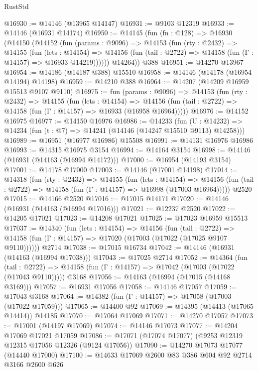 \begin{lexlean}{RustStd}
\begin{coremodule}
@16930 := @14146 (@13965 @14147)
@16931 := @9103 @12319
@16933 := @14146 (@16931 @14174)
@16950 := @14145
    (fun (fn : @128) =>
    @16930
      (@14150
        (@14152
          (fun (params : @9096) =>
          @14153
            (fun (rty : @2432) =>
            @14155
              (fun (lets : @14154) =>
              @14156 (fun (tail : @2722) => @14158 (fun (Γ : @14157) => @16933 @14219))))))
        @14264))
    @388
@16951 := @14270 @13967
@16954 := @14186 (@14187 @388) @15510
@16958 := @14146 (@14178 (@16954 @14194) @14198)
@16959 := @14210 @388
@16964 := @14207 (@14209 @16959 @15513 @9107 @9110)
@16975 := fun (params : @9096) =>
  @14153
    (fun (rty : @2432) =>
    @14155
      (fun (lets : @14154) =>
      @14156 (fun (tail : @2722) => @14158 (fun (Γ : @14157) => @16933 (@16958 @16964)))))
@16976 := @14152 @16975
@16977 := @14150 @16976
@16986 := @14233
    (fun (U : @14232) => @14234 (fun (t : @7) => @14241 (@14146 (@14247 @15510 @9113) @14258)))
@16989 := @16951 (@16977 @16986) @15508
@16991 := @14131 @16976 @16986
@16993 := @14315 @16975 @3154
@16994 := @14164 @3154
@16998 := @14146 (@16931 (@14163 (@16994 @14172)))
@17000 := @16954 (@14193 @3154)
@17001 := @14178 @17000
@17003 := @14146 (@17001 @14198)
@17014 := @14318
    (fun (rty : @2432) =>
    @14155
      (fun (lets : @14154) =>
      @14156 (fun (tail : @2722) => @14158 (fun (Γ : @14157) => @16998 (@17003 @16964)))))
    @2520
@17015 := @14166 @2520
@17016 := @17015 @14171
@17020 := @14146 (@16931 (@14163 (@16994 @17016)))
@17021 := @12237 @2520
@17022 := @14205 @17021
@17023 := @14208 @17021
@17025 := @17023 @16959 @15513
@17037 := @14340
    (fun (lets : @14154) =>
    @14156
      (fun (tail : @2722) =>
      @14158 (fun (Γ : @14157) => @17020 (@17003 (@17022 (@17025 @9107 @9110))))))
    @2714
@17038 := @17015 @16734
@17042 := @14146 (@16931 (@14163 (@16994 @17038)))
@17043 := @17025 @2714
@17052 := @14364
    (fun (tail : @2722) => @14158 (fun (Γ : @14157) => @17042 (@17003 (@17022 (@17043 @9110)))))
    @3168
@17056 := @14163 (@16994 (@17015 (@14168 @3169)))
@17057 := @16931 @17056
@17058 := @14146 @17057
@17059 := @17043 @3168
@17064 := @14382 (fun (Γ : @14157) => @17058 (@17003 (@17022 @17059)))
@17065 := @14400 @92
@17069 := @14395 (@14413 (@17065 @14414)) @14185
@17070 := @17064 @17069
@17071 := @14270 @17057
@17073 := @17001 (@14197 @17069)
@17074 := @14146 @17073
@17077 := @14204 @17069 @17021 @17059
@17086 := @17071 (@17074 @17077) (@9253 @12319 @12315 @17056 @12326 (@9124 @17056))
@17090 := @14270 @17073 @17077 (@14440 @17000)
@17100 := @14633 @17069 @2600 @83 @386 @604 @92 @2714 @3166 @2600 @626

\end{coremodule}
\end{lexlean}
